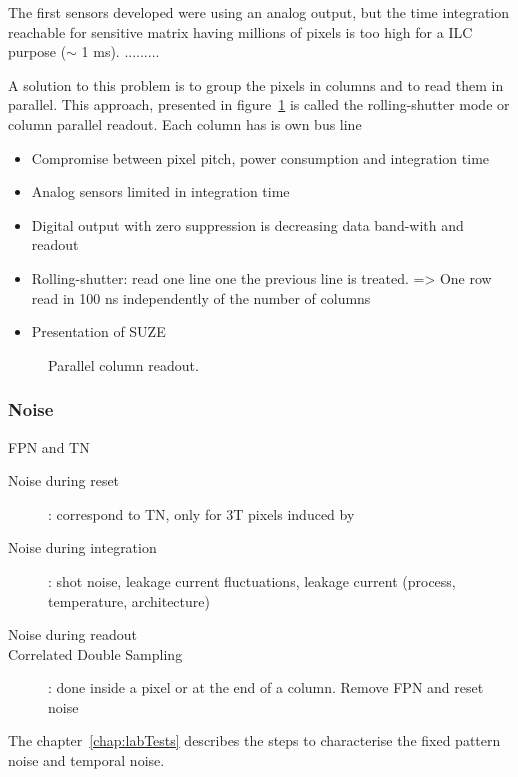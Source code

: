     The first sensors developed were using an analog output, but the time integration reachable for sensitive matrix having millions of pixels is too high for a \gls{ILC} purpose ($\sim$ 1 ms).
.........

    A solution to this problem is to group the pixels in columns and to read them in parallel.
    This approach, presented in figure~\ref{fig:rollShut} is called the rolling-shutter mode or column parallel readout.
    Each column has is own bus line 

     
    \begin{itemize}
      \item Compromise between pixel pitch, power consumption and integration time
      \item Analog sensors limited in integration time
      \item Digital output with zero suppression is decreasing data band-with and readout
      \item Rolling-shutter: read one line one the previous line is treated. => One row read in 100 ns independently of the number of columns
      \item Presentation of SUZE
    \end{itemize}

    \begin{figure}[!h]
      \caption{Parallel column readout.}
      \label{fig:rollShut}
    \end{figure}

    \subsubsection{Noise}

    \gls{FPN} and \gls{TN}
    \begin{description}
      \item[Noise during reset]: correspond to TN, only for 3T pixels induced by 
      \item[Noise during integration]: shot noise, leakage current fluctuations, leakage current (process, temperature, architecture)
      \item[Noise during readout]
      \item[Correlated Double Sampling]: done inside a pixel or at the end of a column. Remove FPN  and reset noise
    \end{description}

    The chapter~\ref{chap:labTests} describes the steps to characterise the fixed pattern noise and temporal noise.


